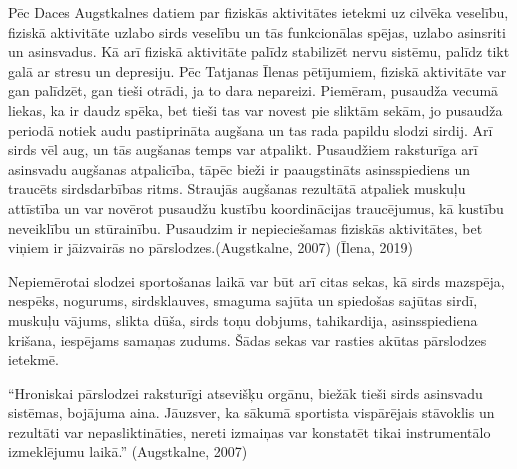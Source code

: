 \documentclass[12pt]{article}
\begin{document}
Pēc Daces Augstkalnes datiem par fiziskās aktivitātes ietekmi uz cilvēka veselību, fiziskā aktivitāte uzlabo sirds veselību un tās funkcionālas spējas, uzlabo asinsriti un asinsvadus. Kā arī fiziskā aktivitāte palīdz stabilizēt nervu sistēmu, palīdz tikt galā ar stresu un depresiju. Pēc Tatjanas Īlenas pētījumiem, fiziskā aktivitāte var gan palīdzēt, gan tieši otrādi, ja to dara nepareizi. Piemēram, pusaudža vecumā liekas, ka ir daudz spēka, bet tieši tas var novest pie sliktām sekām, jo pusaudža periodā notiek audu pastiprināta augšana un tas rada papildu slodzi sirdij. Arī sirds vēl aug, un tās augšanas temps var atpalikt. Pusaudžiem raksturīga arī asins\-vadu augšanas atpalicība, tāpēc bieži ir paaugstināts asinsspiediens un traucēts sirdsdarbības ritms. Straujās augšanas rezultātā atpaliek muskuļu attīstība un var novērot pusaudžu kustību koordinācijas traucējumus, kā kustību neveiklību un stūrainību. Pusaudzim ir nepieciešamas fiziskās aktivitātes, bet viņiem ir jāizvairās no pārslodzes.(Augstkalne, 2007) (Īlena, 2019)\par
Nepiemērotai slodzei sportošanas laikā var būt arī citas sekas, kā sirds mazspēja, nespēks, nogurums, sirdsklauves, smaguma sajūta un spiedošas sajūtas sirdī, muskuļu vājums, slikta dūša, sirds toņu dobjums, tahikardija, asinsspiediena krišana, iespējams samaņas zudums. Šādas sekas var rasties akūtas pārslodzes ietekmē.\par
``Hroniskai pārslodzei raksturīgi atsevišķu orgānu, biežāk tieši sirds asinsvadu sistēmas, bojājuma aina. Jāuzsver, ka sākumā sportista vispārējais stāvoklis un rezultāti var nepasliktināties, nereti izmaiņas var konstatēt tikai instrumentālo izmeklējumu laikā.''
(Augstkalne, 2007)
\end{document}
